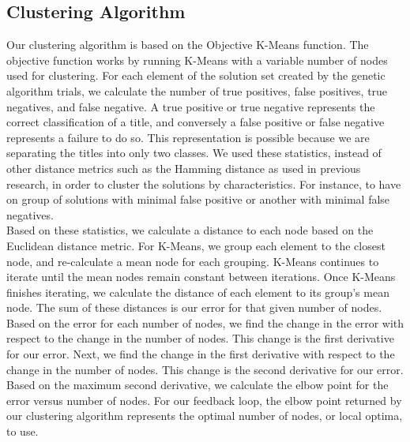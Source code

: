 \documentclass{sig-alternate}
\begin{document}
\subsection{Clustering Algorithm}
Our clustering algorithm is based on the Objective K-Means function. The objective function works by running K-Means with a variable number of nodes used for clustering. For each element of the solution set created by the genetic algorithm trials, we calculate the number of true positives, false positives, true negatives, and false negative. A true positive or true negative represents the correct classification of a title, and conversely a false positive or false negative represents a failure to do so. This representation is possible because we are separating the titles into only two classes. We used these statistics, instead of other distance metrics such as the Hamming distance as used in previous research\cite{ole:feedback}, in order to cluster the solutions by characteristics. For instance, to have on group of solutions with minimal false positive or another with minimal false negatives.\\
\indent Based on these statistics, we calculate a distance to each node based on the Euclidean distance metric. For K-Means, we group each element to the closest node, and re-calculate a mean node for each grouping. K-Means continues to iterate until the mean nodes remain constant between iterations. Once K-Means finishes iterating, we calculate the distance of each element to its group's mean node. The sum of these distances is our error for that given number of nodes.\\
\indent Based on the error for each number of nodes, we find the change in the error with respect to the change in the number of nodes. This change is the first derivative for our error. Next, we find the change in the first derivative with respect to the change in the number of nodes. This change is the second derivative for our error. Based on the maximum second derivative, we calculate the elbow point for the error versus number of nodes. For our feedback loop, the elbow point returned by our clustering algorithm represents the optimal number of nodes, or local optima, to use.
\end{document}

